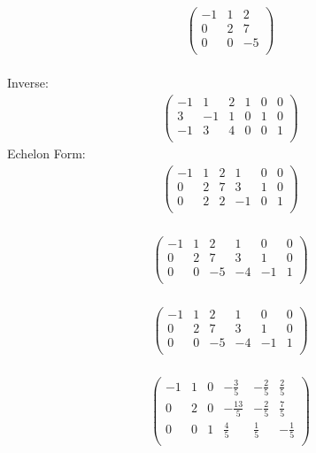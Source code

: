 \documentclass{article}
\begin{document}
\\
\begin{align*}
\begin{pmatrix}
-1 & 1 & 2\\
0 & 2 & 7\\
0 & 0 & -5\\
\end{pmatrix}
\end{align*}
\\
Inverse:\\
\begin{align*}
\left(
\begin{array}{ccccc|c}
-1 & 1 & 2 & 1 & 0 & 0\\
3 & -1 & 1 & 0 & 1 & 0\\
-1 & 3 & 4 & 0 & 0 & 1\\
\end{array}
\right)
\end{align*}
Echelon Form:\\
\begin{align*}
\left(
\begin{array}{ccccc|c}
-1 & 1 & 2 & 1 & 0 & 0\\
0 & 2 & 7 & 3 & 1 & 0\\
0 & 2 & 2 & -1 & 0 & 1\\
\end{array}
\right)
\end{align*}
\\
\begin{align*}
\left(
\begin{array}{ccccc|c}
-1 & 1 & 2 & 1 & 0 & 0\\
0 & 2 & 7 & 3 & 1 & 0\\
0 & 0 & -5 & -4 & -1 & 1\\
\end{array}
\right)
\end{align*}
\\
\begin{align*}
\left(
\begin{array}{ccccc|c}
-1 & 1 & 2 & 1 & 0 & 0\\
0 & 2 & 7 & 3 & 1 & 0\\
0 & 0 & -5 & -4 & -1 & 1\\
\end{array}
\right)
\end{align*}
\\
\begin{align*}
\left(
\begin{array}{ccccc|c}
-1 & 1 & 0 & -\frac{3}{5} & -\frac{2}{5} & \frac{2}{5}\\
0 & 2 & 0 & -\frac{13}{5} & -\frac{2}{5} & \frac{7}{5}\\
0 & 0 & 1 & \frac{4}{5} & \frac{1}{5} & -\frac{1}{5}\\
\end{array}
\right)
\end{align*}
\end{document}
